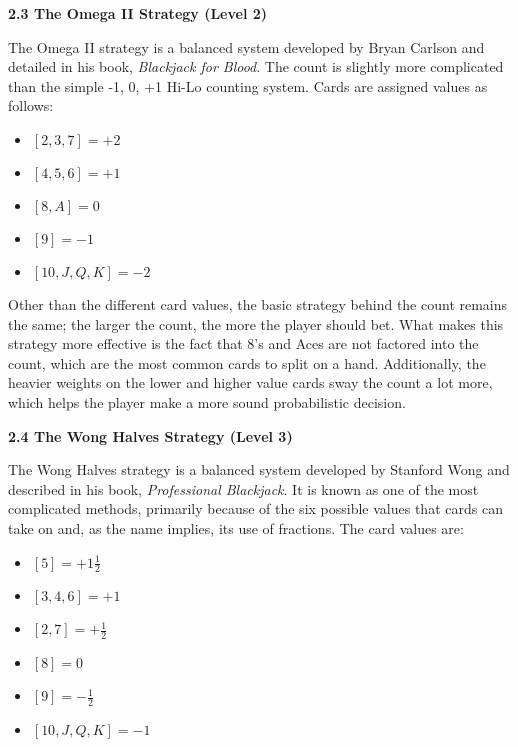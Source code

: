 \documentclass[12pt]{article}
\begin{document}
    \textbf{2.3 The Omega II Strategy (Level 2)} \newline

    The Omega II strategy is a balanced system developed by Bryan Carlson and detailed in his book, \textit{Blackjack for Blood}. The count is slightly more complicated than the simple -1, 0, +1 Hi-Lo counting system. Cards are assigned values as follows:

    \begin{itemize}
    	\item $[2, 3, 7] = +2$
        \item $[4, 5, 6] = +1$
        \item $[8, A] = 0$
        \item $[9] = -1$
        \item $[10, J, Q, K] = -2$
    \end{itemize}

    Other than the different card values, the basic strategy behind the count remains the same; the larger the count, the more the player should bet. What makes this strategy more effective is the fact that 8’s and Aces are not factored into the count, which are the most common cards to split on a hand. Additionally, the heavier weights on the lower and higher value cards sway the count a lot more, which helps the player make a more sound probabilistic decision. \newline

    \textbf{2.4 The Wong Halves Strategy (Level 3)} \newline

    The Wong Halves strategy is a balanced system developed by Stanford Wong and described in his book, \textit{Professional Blackjack}. It is known as one of the most complicated methods, primarily because of the six possible values that cards can take on and, as the name implies, its use of fractions. The card values are:

	\begin{itemize}
    	\item $[5] = +1 \frac{1}{2}$
        \item $[3, 4, 6] = +1$
        \item $[2, 7] = +\frac{1}{2}$
        \item $[8] = 0$
        \item $[9] = -\frac{1}{2}$
        \item $[10, J, Q, K] = -1$
    \end{itemize}
\end{document}
